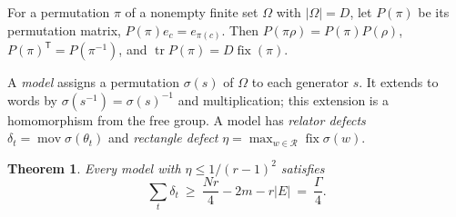 \documentclass[11pt]{article}
\newtheorem{theorem}{Theorem}[section]
\theoremstyle{definition}
\theoremstyle{remark}
\numberwithin{equation}{section}
\DeclareMathOperator{\tr}{tr}
\DeclareMathOperator{\fix}{fix}
\DeclareMathOperator{\mov}{mov}
\newcommand{\cR}{\mathcal R}
\begin{document}
For a permutation $\pi$ of a nonempty finite set $\Omega$ with $|\Omega|=D$, let $P(\pi)$ be its permutation matrix, $P(\pi)e_c=e_{\pi(c)}$. Then $P(\pi\rho)=P(\pi)P(\rho)$, $P(\pi)^{\mathsf T}=P(\pi^{-1})$, and $\tr P(\pi)=D\fix(\pi)$.

A \emph{model} assigns a permutation $\sigma(s)$ of $\Omega$ to each generator $s$. It extends to words by $\sigma(s^{-1})=\sigma(s)^{-1}$ and multiplication; this extension is a homomorphism from the free group. A model has \emph{relator defects} $\delta_t=\mov\sigma(\theta_t)$ and \emph{rectangle defect} $\eta=\max_{w\in\cR}\fix\sigma(w)$.

\begin{theorem}\label{thm:ineq}
Every model with $\eta\le1/(r-1)^2$ satisfies
\[
 \sum_t\delta_t\ \ge\ \frac{Nr}{4}-2m-r|E|\ =\ \frac{\Gamma}{4}.
\]
\end{theorem}
\end{document}
